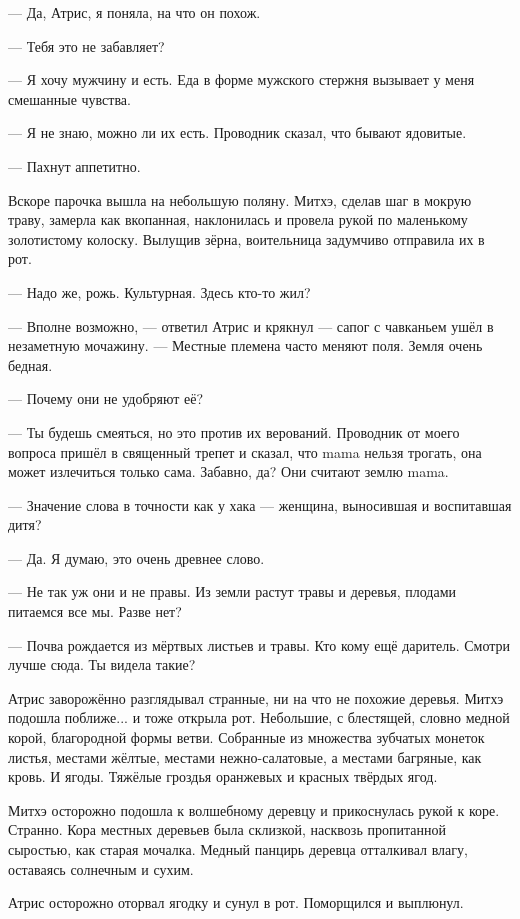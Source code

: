 --- Да, Атрис, я поняла, на что он похож.

--- Тебя это не забавляет?

--- Я хочу мужчину и есть.
Еда в форме мужского стержня вызывает у меня смешанные чувства.

--- Я не знаю, можно ли их есть.
Проводник сказал, что бывают ядовитые.

--- Пахнут аппетитно.

Вскоре парочка вышла на небольшую поляну.
Митхэ, сделав шаг в мокрую траву, замерла как вкопанная, наклонилась и провела рукой по маленькому золотистому колоску.
Вылущив зёрна, воительница задумчиво отправила их в рот.

--- Надо же, рожь.
Культурная.
Здесь кто-то жил?

--- Вполне возможно, --- ответил Атрис и крякнул --- сапог с чавканьем ушёл в незаметную мочажину.
--- Местные племена часто меняют поля.
Земля очень бедная.

--- Почему они не удобряют её?

--- Ты будешь смеяться, но это против их верований.
Проводник от моего вопроса пришёл в священный трепет и сказал, что mama нельзя трогать, она может излечиться только сама.
Забавно, да?
Они считают землю mama.

--- Значение слова в точности как у хака --- женщина, выносившая и воспитавшая дитя?

--- Да.
Я думаю, это очень древнее слово.

--- Не так уж они и не правы.
Из земли растут травы и деревья, плодами питаемся все мы.
Разве нет?

--- Почва рождается из мёртвых листьев и травы.
Кто кому ещё даритель.
Смотри лучше сюда.
Ты видела такие?

Атрис заворожённо разглядывал странные, ни на что не похожие деревья.
Митхэ подошла поближе... и тоже открыла рот.
Небольшие, с блестящей, словно медной корой, благородной формы ветви.
Собранные из множества зубчатых монеток листья, местами жёлтые, местами нежно-салатовые, а местами багряные, как кровь.
И ягоды.
Тяжёлые гроздья оранжевых и красных твёрдых ягод.

Митхэ осторожно подошла к волшебному деревцу и прикоснулась рукой к коре.
Странно.
Кора местных деревьев была склизкой, насквозь пропитанной сыростью, как старая мочалка.
Медный панцирь деревца отталкивал влагу, оставаясь солнечным и сухим.

Атрис осторожно оторвал ягодку и сунул в рот.
Поморщился и выплюнул.

